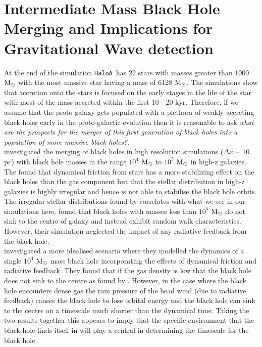 \documentclass[graphics, twocolumn, usenatbib]{mn2e}
\newcommand{\msolar} {$\rm{M_{\odot}}~$}
\newcommand{\msolarc} {$\rm{M_{\odot}}$}
\newcommand{\ha} {\texttt{HaloA~}}
\begin{document}
\section{Intermediate Mass Black Hole Merging and Implications for Gravitational Wave detection} \label{Sec:Discussion}
At the end of the simulation \ha has 22 stars with masses greater than 1000 \msolar with the most
massive star having a mass of 6128 \msolarc. The simulations show that accretion onto the stars is
focused on the early stages in the life of the star with most of the mass accreted within the
first 10 - 20 kyr. Therefore, if we assume that the proto-galaxy gets populated with a plethora of
weakly accreting black holes early in the proto-galactic evolution then it is reasonable to ask \textit{what are the prospects for the merger of this first generation
  of black holes into a population of more massive black holes?}.\\
\indent \cite{Pfister_2019} investigated the merging of black holes in high resolution
simulations ($\Delta x \sim 10$ pc) with black hole masses in the range
$10^4$ \msolar to $10^5$ \msolar in high-z galaxies. The found that dynamical friction from stars
has a more stabilizing effect on the black holes than the gas component but that the stellar
distribution in high-z galaxies is highly irregular and hence is not able to stabilise the black
hole orbits. The irregular stellar distributions found by \cite{Pfister_2019} correlates with what
we see in our simulations here. \cite{Pfister_2019} found that black holes with masses less than
$10^5$ \msolar do not sink to the centre of galaxy and instead exhibit random walk characteristics.
However, their simulation neglected the impact of any radiative feedback from the black hole.\\
\indent \cite{Toyouchi_2020} investigated a more idealised scenario where they modelled the
dynamics of a single $10^4$ \msolar mass black hole incorporating the effects of dynamical friction
and radiative feedback. They found that if the gas density is low that the black hole
does not sink to the centre as found by \cite{Pfister_2019}. However, in the case where
the black hole encounters dense gas the ram pressure of the head wind (due to radiative feedback)
causes the black hole to lose orbital energy and the black hole can sink to the centre on a
timescale much shorter than the dynamical time. Taking the two results together this
appears to imply that the specific environment that the black hole finds
itself in will play a central in determining the timescale for the black hole
\end{document}
